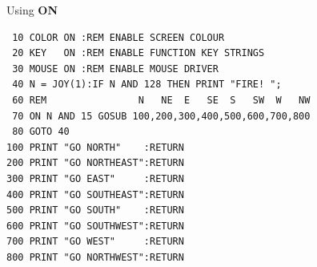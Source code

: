 \begin{description}[leftmargin=2cm,style=nextline]
\newpage
\item [Example:] Using {\bf ON}
\begin{tcolorbox}[colback=black,coltext=white]
\verbatimfont{\codefont}
\begin{verbatim}
 10 COLOR ON :REM ENABLE SCREEN COLOUR
 20 KEY   ON :REM ENABLE FUNCTION KEY STRINGS
 30 MOUSE ON :REM ENABLE MOUSE DRIVER
 40 N = JOY(1):IF N AND 128 THEN PRINT "FIRE! ";
 60 REM                N   NE  E   SE  S   SW  W   NW
 70 ON N AND 15 GOSUB 100,200,300,400,500,600,700,800
 80 GOTO 40
100 PRINT "GO NORTH"    :RETURN
200 PRINT "GO NORTHEAST":RETURN
300 PRINT "GO EAST"     :RETURN
400 PRINT "GO SOUTHEAST":RETURN
500 PRINT "GO SOUTH"    :RETURN
600 PRINT "GO SOUTHWEST":RETURN
700 PRINT "GO WEST"     :RETURN
800 PRINT "GO NORTHWEST":RETURN
\end{verbatim}
\end{tcolorbox}
\end{description}


\newpage
